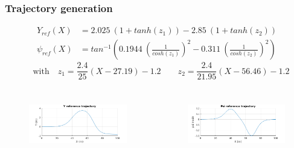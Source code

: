 \documentclass{beamer}
\begin{document}
\begin{frame}
\frametitle{Trajectory generation}

\begin{align*}
Y_{ref}(X) &= 2.025 \ (1 + tanh(z_1)) - 2.85 \ (1 + tanh(z_2)) \\
\psi_{ref}(X) &= tan^{-1} \left( 0.1944 \ \left(\frac{1}{cosh(z_1)}\right)^2 - 0.311 \ \left(\frac{1}{cosh(z_2)}\right)^2 \right)
\end{align*}
\[\quad \text{with} \quad z_1 = \frac{2.4}{25}(X - 27.19) - 1.2 \qquad z_2 =
\frac{2.4}{21.95}(X - 56.46) - 1.2 \]


\begin{columns}[t,onlytextwidth]
\begin{figure} [h]
\begin{center}
\includegraphics[scale=0.37]{images/Yref_graph.png}
\label{fig:pendel}
\end{center}
\end{figure}

\begin{figure} [h]
\begin{center}
\includegraphics[scale=0.37]{images/Psiref_graph.png}
\label{fig:pendel}
\end{center}
\end{figure}

\end{columns}

\end{frame}
\end{document}
